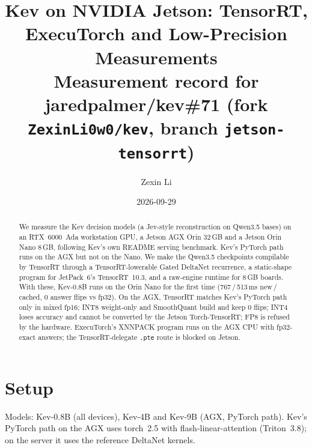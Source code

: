 \documentclass[10pt]{article}
\title{Kev on NVIDIA Jetson: TensorRT, ExecuTorch and Low-Precision Measurements\\[2pt]\large Measurement record for jaredpalmer/kev\#71 (fork \texttt{ZexinLi0w0/kev}, branch \texttt{jetson-tensorrt})}
\author{Zexin Li}
\date{2026-09-29}
\begin{document}
\maketitle

\begin{abstract}
We measure the Kev decision models (a Jev-style reconstruction on Qwen3.5 bases) on an RTX~6000~Ada workstation GPU, a Jetson AGX Orin 32\,GB and a Jetson Orin Nano 8\,GB, following Kev's own README serving benchmark. Kev's PyTorch path runs on the AGX but not on the Nano. We make the Qwen3.5 checkpoints compilable by TensorRT through a TensorRT-lowerable Gated DeltaNet recurrence, a static-shape program for JetPack~6's TensorRT~10.3, and a raw-engine runtime for 8\,GB boards. With these, Kev-0.8B runs on the Orin Nano for the first time (767\,/\,513\,ms new\,/\,cached, 0 answer flips vs fp32). On the AGX, TensorRT matches Kev's PyTorch path only in mixed fp16; INT8 weight-only and SmoothQuant build and keep 0 flips; INT4 loses accuracy and cannot be converted by the Jetson Torch-TensorRT; FP8 is refused by the hardware. ExecuTorch's XNNPACK program runs on the AGX CPU with fp32-exact answers; the TensorRT-delegate \texttt{.pte} route is blocked on Jetson.
\end{abstract}

\section{Setup}
\noindent{}

\medskip
Models: Kev-0.8B (all devices), Kev-4B and Kev-9B (AGX, PyTorch path). Kev's PyTorch path on the AGX uses torch~2.5 with flash-linear-attention (Triton~3.8); on the server it uses the reference DeltaNet kernels.
\end{document}
